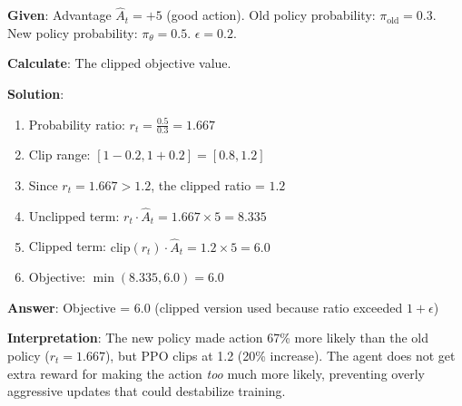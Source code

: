 \documentclass[11pt,a4paper]{article}
\begin{document}
\begin{tcolorbox}[colback=blue!5!white,colframe=blue!75!black,title=\textbf{Worked Example 43: PPO Clipping}]
\textbf{Given}: Advantage $\hat{A}_t = +5$ (good action). Old policy probability: $\pi_{\text{old}} = 0.3$. New policy probability: $\pi_\theta = 0.5$. $\epsilon = 0.2$.

\textbf{Calculate}: The clipped objective value.

\textbf{Solution}:
\begin{enumerate}
    \item Probability ratio: $r_t = \frac{0.5}{0.3} = 1.667$
    \item Clip range: $[1 - 0.2, 1 + 0.2] = [0.8, 1.2]$
    \item Since $r_t = 1.667 > 1.2$, the clipped ratio = $1.2$
    \item Unclipped term: $r_t \cdot \hat{A}_t = 1.667 \times 5 = 8.335$
    \item Clipped term: $\text{clip}(r_t) \cdot \hat{A}_t = 1.2 \times 5 = 6.0$
    \item Objective: $\min(8.335, 6.0) = 6.0$
\end{enumerate}

\textbf{Answer}: Objective = 6.0 (clipped version used because ratio exceeded $1+\epsilon$)

\textbf{Interpretation}: The new policy made action 67\% more likely than the old policy ($r_t = 1.667$), but PPO clips at 1.2 (20\% increase). The agent does not get extra reward for making the action \emph{too} much more likely, preventing overly aggressive updates that could destabilize training.
\end{tcolorbox}
\end{document}
